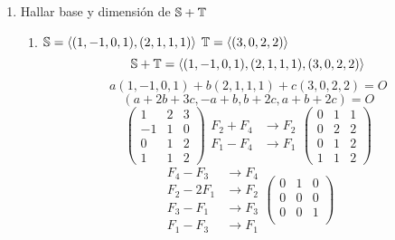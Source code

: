 \documentclass[../practica.root.tex]{subfiles}
\begin{document}
\begin{enumerate}
\begin{enumerate}
          \end{enumerate}
    \item Hallar base y dimensión de $\S+\T$ \xmark %
          \begin{enumerate}
              \item $\S = \langle (1,-1,0,1),(2,1,1,1) \rangle$ $\T = \langle(3,0,2,2)\rangle$
                    \[ \S + \T = \langle (1,-1,0,1),(2,1,1,1),(3,0,2,2) \rangle \]
                    \[ a(1,-1,0,1) + b(2,1,1,1) + c(3,0,2,2) = O \]
                    \[ (a + 2b + 3c, -a + b, b + 2c, a + b + 2c) = O \]
                    \[
                        \begin{pmatrix}
                            1  & 2 & 3 \\
                            -1 & 1 & 0 \\
                            0  & 1 & 2 \\
                            1  & 1 & 2
                        \end{pmatrix}
                        \begin{array}{rl}
                            F_2 + F_4 & \to F_2 \\
                            F_1 - F_4 & \to F_1
                        \end{array}
                        \begin{pmatrix}
                            0 & 1 & 1 \\
                            0 & 2 & 2 \\
                            0 & 1 & 2 \\
                            1 & 1 & 2
                        \end{pmatrix}
                    \] \[
                        \begin{array}{rl}
                            F_4 - F_3  & \to F_4 \\
                            F_2 - 2F_1 & \to F_2 \\
                            F_3 - F_1  & \to F_3 \\
                            F_1 - F_3  & \to F_1
                        \end{array}
                        \begin{pmatrix}
                            0 & 1 & 0 \\
                            0 & 0 & 0 \\
                            0 & 0 & 1 \\

\end{pmatrix}\]
\end{enumerate}
\end{enumerate}
\end{document}
